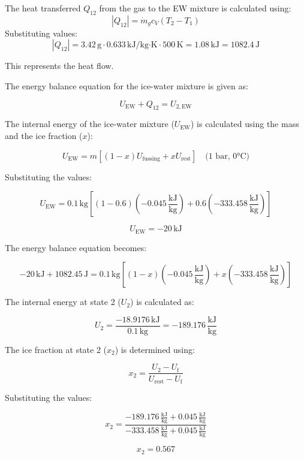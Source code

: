 The heat transferred \( Q_{12} \) from the gas to the EW mixture is calculated using:  
\[
|Q_{12}| = \dot{m}_g c_V (T_2 - T_1)
\]  
Substituting values:  
\[
|Q_{12}| = 3.42 \, \text{g} \cdot 0.633 \, \text{kJ/kg·K} \cdot 500 \, \text{K} = 1.08 \, \text{kJ} = 1082.4 \, \text{J}
\]  

This represents the heat flow.

The energy balance equation for the ice-water mixture is given as:

\[
U_{\text{EW}} + Q_{12} = U_{2,\text{EW}}
\]

The internal energy of the ice-water mixture (\( U_{\text{EW}} \)) is calculated using the mass and the ice fraction (\( x \)):

\[
U_{\text{EW}} = m \left[ (1-x) U_{\text{fussing}} + x U_{\text{rest}} \right] \quad \text{(1 bar, 0°C)}
\]

Substituting the values:

\[
U_{\text{EW}} = 0.1 \, \text{kg} \left[ (1-0.6)(-0.045 \, \frac{\text{kJ}}{\text{kg}}) + 0.6(-333.458 \, \frac{\text{kJ}}{\text{kg}}) \right]
\]

\[
U_{\text{EW}} = -20 \, \text{kJ}
\]

The energy balance equation becomes:

\[
-20 \, \text{kJ} + 1082.45 \, \text{J} = 0.1 \, \text{kg} \left[ (1-x)(-0.045 \, \frac{\text{kJ}}{\text{kg}}) + x(-333.458 \, \frac{\text{kJ}}{\text{kg}}) \right]
\]

The internal energy at state 2 (\( U_2 \)) is calculated as:

\[
U_2 = \frac{-18.9176 \, \text{kJ}}{0.1 \, \text{kg}} = -189.176 \, \frac{\text{kJ}}{\text{kg}}
\]

The ice fraction at state 2 (\( x_2 \)) is determined using:

\[
x_2 = \frac{U_2 - U_{\text{f}}}{U_{\text{rest}} - U_{\text{f}}}
\]

Substituting the values:

\[
x_2 = \frac{-189.176 \, \frac{\text{kJ}}{\text{kg}} + 0.045 \, \frac{\text{kJ}}{\text{kg}}}{-333.458 \, \frac{\text{kJ}}{\text{kg}} + 0.045 \, \frac{\text{kJ}}{\text{kg}}}
\]

\[
x_2 = 0.567
\]